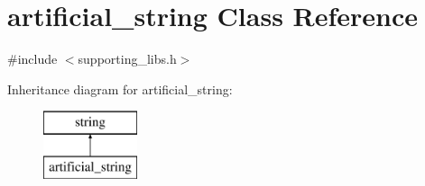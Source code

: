 \hypertarget{classartificial__string}{\section{artificial\-\_\-string Class Reference}
\label{classartificial__string}
}


{\ttfamily \#include $<$supporting\-\_\-libs.\-h$>$}

Inheritance diagram for artificial\-\_\-string\-:\begin{figure}[H]
\begin{center}
\leavevmode
\includegraphics[height=2.000000cm]{classartificial__string}
\end{center}
\end{figure}
